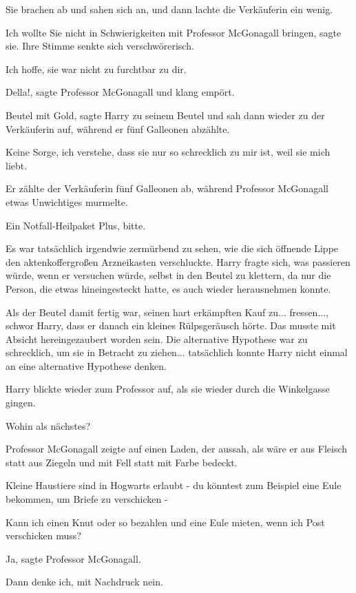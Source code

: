 Sie brachen ab und sahen sich an, und dann lachte die Verkäuferin ein wenig.

\glqq Ich wollte Sie nicht in Schwierigkeiten mit Professor McGonagall
bringen\grqq{}, sagte sie. Ihre Stimme senkte sich verschwörerisch.

\glqq Ich hoffe, sie war nicht zu furchtbar zu dir.\grqq{}

\glqq Della!\grqq{}, sagte Professor McGonagall und klang empört.

\glqq Beutel mit Gold\grqq{}, sagte Harry zu seinem Beutel und sah dann wieder
zu der Verkäuferin auf, während er fünf Galleonen abzählte.

\glqq Keine Sorge, ich verstehe, dass sie nur so schrecklich zu mir ist, weil
sie mich liebt.\grqq{}

Er zählte der Verkäuferin fünf Galleonen ab, während Professor McGonagall etwas
Unwichtiges murmelte.

\glqq Ein Notfall-Heilpaket Plus, bitte.\grqq{}

Es war tatsächlich irgendwie zermürbend zu sehen, wie die sich öffnende Lippe
den aktenkoffergroßen Arzneikasten verschluckte. Harry fragte sich, was
passieren würde, wenn er versuchen würde, selbst in den Beutel zu klettern, da
nur die Person, die etwas hineingesteckt hatte, es auch wieder herausnehmen
konnte.

Als der Beutel damit fertig war, seinen hart erkämpften Kauf zu... fressen...,
schwor Harry, dass er danach ein kleines Rülpsgeräusch hörte. Das musste mit
Absicht hereingezaubert worden sein. Die alternative Hypothese war zu
schrecklich, um sie in Betracht zu ziehen... tatsächlich konnte Harry nicht
einmal an eine alternative Hypothese denken.

Harry blickte wieder zum Professor auf, als sie wieder durch die Winkelgasse
gingen.

\glqq Wohin als nächstes?\grqq{}

Professor McGonagall zeigte auf einen Laden, der aussah, als wäre er aus Fleisch
statt aus Ziegeln und mit Fell statt mit Farbe bedeckt.

\glqq Kleine Haustiere sind in Hogwarts erlaubt - du könntest zum Beispiel eine
Eule bekommen, um Briefe zu verschicken -\grqq{}

\glqq Kann ich einen Knut oder so bezahlen und eine Eule mieten, wenn ich Post
verschicken muss?\grqq{}

\glqq Ja\grqq{}, sagte Professor McGonagall.

\glqq Dann denke ich, mit Nachdruck nein.\grqq{}

